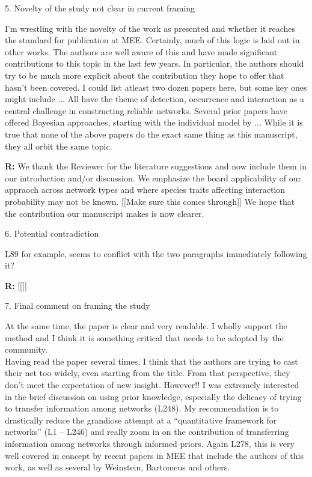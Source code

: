 \documentclass[12pt]{letter}
\newenvironment{refquote}{\bigskip \begin{it}}{\end{it}\smallskip}
\begin{document}
	5. Novelty of the study not clear in current framing

	\begin{refquote}
	I’m wrestling with the novelty of the work as presented and whether it reaches the standard for publication at MEE. Certainly, much of this logic is laid out in other works. The authors are well aware of this and have made significant contributions to this topic in the last few years. In particular, the authors should try to be much more explicit about the contribution they hope to offer that hasn’t been covered. I could list atleast two dozen papers here, but some key ones might include ...	All have the theme of detection, occurrence and interaction as a central challenge in constructing reliable networks. Several prior papers have offered Bayesian approaches, starting with the individual model by ...
	While it is true that none of the above papers do the exact same thing as this manuscript, they all	orbit the same topic. 
	\end{refquote}


	\textbf{R:} We thank the Reviewer for the literature suggestions and now include them in our introduction and/or discussion. We emphasize the board applicability of our appraoch across network types and where species traits affecting interaction probability may not be known. [[Make sure this comes through]] We hope that the contribution our manuscript makes is now clearer.


	6. Potential contradiction

	\begin{refquote}
	L89 for example, seems to conflict with the two paragraphs immediately following it?
	\end{refquote}


	\textbf{R:} [[]]


	7. Final comment on framing the study

	\begin{refquote}
	At the same time, the paper is clear and very readable. I wholly support the method and I think it is something critical that needs to be adopted by the community. \\
	Having read the paper several times, I think that the authors are trying to cast their net too widely, even starting from the title. From that perspective, they don’t meet the expectation of new insight. However!! I was extremely interested in the brief discussion on using prior knowledge, especially the delicacy of trying to transfer information among networks (L248). My recommendation is to drastically reduce the grandiose attempt at a “quantitative framework for networks” (L1 – L246) and really zoom in on the contribution of transferring information among networks through informed priors.	Again L278, this is very well covered in concept by recent papers in MEE that include the authors of this work, as well as several by Weinstein, Bartomeus and others.
	\end{refquote}
\end{document}
